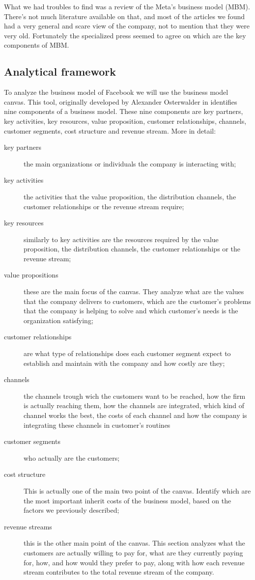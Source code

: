 What we had troubles to find was a review of the Meta's business
model (MBM). There's not much literature available on that, and most of the
articles we found had a very general and scare view of the company,
not to mention that they were very old. Fortunately the specialized
press seemed to agree on which are the key components of MBM. 

\subsection{Analytical framework}\label{sub:analytical}
To analyze the business model of Facebook we will use the business
model canvas. This tool, originally developed by Alexander Osterwalder
in \cite{art:osterwalder2010business} identifies nine components of a
business model. These nine components are key partners, key
activities, key resources, value proposition, customer relationships,
channels, customer segments, cost structure and revenue stream. More
in detail:
\begin{description}
\item[key partners] the main organizations or individuals the company
  is interacting with;
\item[key activities] the activities that the value proposition, the
  distribution channels, the customer relationships or the revenue
  stream require;
\item[key resources] similarly to key activities are the resources
  required by the value proposition, the distribution channels, the
  customer relationships or the revenue stream;
\item[value propositions] these are the main focus of the canvas.
  They analyze what are the values that the company delivers to
  customers, which are the customer's problems that the company is
  helping to solve and which customer's needs is the organization
  satisfying;
\item[customer relationships] are what type of relationships does each
  customer segment expect to establish and maintain with the company
  and how costly are they;
\item[channels] the channels trough wich the customers want to be
  reached, how the firm is actually reaching them, how the channels
  are integrated, which kind of channel works the best, the costs of
  each channel and how the company is integrating these channels in
  customer's routines
\item[customer segments] who actually are the customers;
\item[cost structure] This is actually one of the main two point of
  the canvas. Identify which are the most important inherit costs of
  the business model, based on the factors we previously described;
\item[revenue streams] this is the other main point of the
  canvas. This section analyzes what the customers are actually
  willing to pay for, what are they currently paying for, how, and how
  would they prefer to pay, along with how each revenue stream
  contributes to the total revenue stream of the company.
\end{description}

